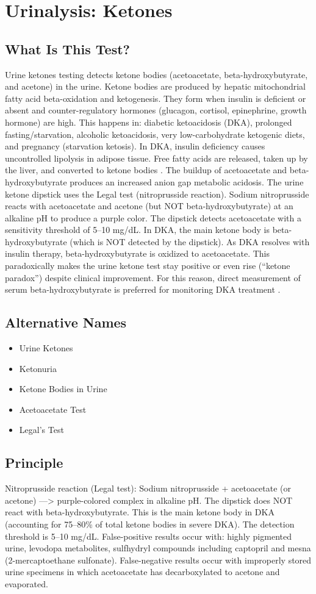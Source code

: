 \chapter{Urinalysis: Ketones}
\section*{What Is This Test?}
Urine ketones testing detects ketone bodies (acetoacetate, beta-hydroxybutyrate, and acetone) in the urine. Ketone bodies are produced by hepatic mitochondrial fatty acid beta-oxidation and ketogenesis. They form when insulin is deficient or absent and counter-regulatory hormones (glucagon, cortisol, epinephrine, growth hormone) are high. This happens in: diabetic ketoacidosis (DKA), prolonged fasting/starvation, alcoholic ketoacidosis, very low-carbohydrate ketogenic diets, and pregnancy (starvation ketosis). In DKA, insulin deficiency causes uncontrolled lipolysis in adipose tissue. Free fatty acids are released, taken up by the liver, and converted to ketone bodies \cite{mcgarry1980regulation}. The buildup of acetoacetate and beta-hydroxybutyrate produces an increased anion gap metabolic acidosis. The urine ketone dipstick uses the Legal test (nitroprusside reaction). Sodium nitroprusside reacts with acetoacetate and acetone (but NOT beta-hydroxybutyrate) at an alkaline pH to produce a purple color. The dipstick detects acetoacetate with a sensitivity threshold of 5--10 mg/dL. In DKA, the main ketone body is beta-hydroxybutyrate (which is NOT detected by the dipstick). As DKA resolves with insulin therapy, beta-hydroxybutyrate is oxidized to acetoacetate. This paradoxically makes the urine ketone test stay positive or even rise (``ketone paradox'') despite clinical improvement. For this reason, direct measurement of serum beta-hydroxybutyrate is preferred for monitoring DKA treatment \cite{laffel1999ketone}.
\section*{Alternative Names}
\begin{itemize}
  \item Urine Ketones
  \item Ketonuria
  \item Ketone Bodies in Urine
  \item Acetoacetate Test
  \item Legal's Test
\end{itemize}
\section*{Principle}
Nitroprusside reaction (Legal test): Sodium nitroprusside + acetoacetate (or acetone) ---> purple-colored complex in alkaline pH. The dipstick does NOT react with beta-hydroxybutyrate. This is the main ketone body in DKA (accounting for 75--80\% of total ketone bodies in severe DKA). The detection threshold is 5--10 mg/dL. False-positive results occur with: highly pigmented urine, levodopa metabolites, sulfhydryl compounds including captopril and mesna (2-mercaptoethane sulfonate). False-negative results occur with improperly stored urine specimens in which acetoacetate has decarboxylated to acetone and evaporated.
